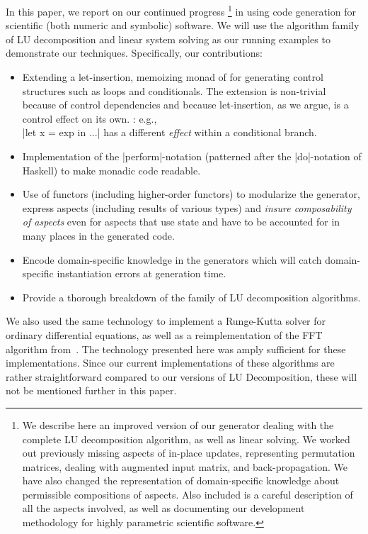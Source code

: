 \documentclass[draft]{elsart}
\begin{document}
In this paper, we report on our continued progress \cite{CaretteKiselyov05}
\footnote{We describe here an improved version of our generator
  dealing with the complete LU decomposition algorithm, as well as
  linear solving. We worked out previously missing aspects of in-place
  updates, representing permutation matrices, dealing with augmented 
  input matrix, and back-propagation. We have also changed the representation
  of domain-specific knowledge about permissible compositions of aspects.
  Also included is a careful description of all the aspects involved, as
  well as documenting our development methodology for highly parametric
  scientific software.}
in using code generation for scientific (both numeric and symbolic)
software.  We will use the algorithm family of LU decomposition 
and linear system solving as our running examples to demonstrate our
techniques.  Specifically, our contributions:
\begin{itemize}
    \item Extending a let-insertion, memoizing monad of
      \cite{MSP:PADL04,KiselyovTaha} for generating control structures
      such as loops and conditionals. The extension is non-trivial
      because of control dependencies and because
      let-insertion, as we argue, is a control effect on its own.
      : e.g.,\\
      |let x = exp in ...| has a different \emph{effect} within a
      conditional branch.
    \item Implementation of the |perform|-notation (patterned after
      the |do|-notation of Haskell) to make monadic code readable.
    \item Use of functors (including higher-order functors) to
      modularize the generator, express aspects (including results of
      various types) and \emph{insure composability of aspects} even
      for aspects that use state and have to be accounted for in many
      places in the generated code.
    \item Encode domain-specific knowledge in the generators which 
      will catch domain-specific instantiation errors at generation
      time.
    \item Provide a thorough breakdown of the family of LU decomposition
      algorithms.
\end{itemize}

We also used the same technology to implement a Runge-Kutta solver for
ordinary differential equations, as well as a reimplementation of
the FFT algorithm from~\cite{KiselyovTaha}.  The technology presented
here was amply sufficient for these implementations.  Since our current
implementations of these algorithms are rather straightforward compared to 
our versions of LU Decomposition, these will not be mentioned further
in this paper.
\end{document}
